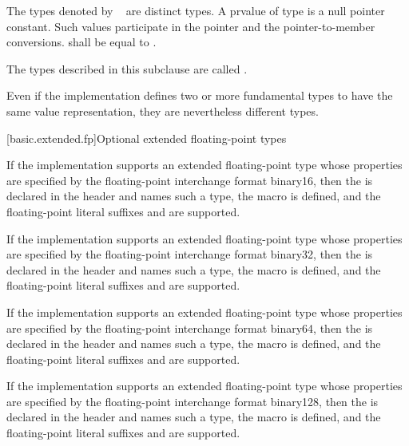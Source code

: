 \pnum
The types denoted by \cv~ are distinct types.
A prvalue of type  is a null pointer
constant. Such values participate in the pointer and the
pointer-to-member conversions.
 shall be equal to .

\pnum
{}%
The types described in this subclause
are called .
\begin{note}
Even if the implementation defines two or more fundamental types to have the
same value representation, they are nevertheless different types.
\end{note}

[basic.extended.fp]{Optional extended floating-point types}

\pnum
If the implementation supports an extended floating-point type
whose properties are specified by
the \IsoFloatUndated{} floating-point interchange format binary16,
then the  
is declared in the header  and names such a type,
the macro  is defined, and
the floating-point literal suffixes  and 
are supported.

\pnum
If the implementation supports an extended floating-point type
whose properties are specified by
the \IsoFloatUndated{} floating-point interchange format binary32,
then the  
is declared in the header  and names such a type,
the macro  is defined, and
the floating-point literal suffixes  and  are supported.

\pnum
If the implementation supports an extended floating-point type
whose properties are specified by
the \IsoFloatUndated{} floating-point interchange format binary64,
then the  
is declared in the header  and names such a type,
the macro  is defined, and
the floating-point literal suffixes  and  are supported.

\pnum
If the implementation supports an extended floating-point type
whose properties are specified by
the \IsoFloatUndated{} floating-point interchange format binary128,
then the  
is declared in the header  and names such a type,
the macro  is defined, and
the floating-point literal suffixes  and  are supported.

